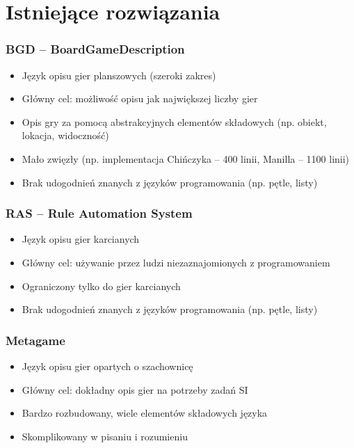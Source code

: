 \documentclass{beamer}
\begin{document}
\section{Istniejące rozwiązania}

\begin{frame}
	\frametitle{BGD -- BoardGameDescription\cite{BGD}}
	\begin{itemize}
		\item Język opisu gier planszowych (szeroki zakres)
		\item Główny cel: możliwość opisu jak największej liczby gier
		\item Opis gry za pomocą abstrakcyjnych elementów składowych (np. obiekt, lokacja, widoczność)
		\item Mało zwięzły (np. implementacja Chińczyka -- 400 linii, Manilla -- 1100 linii)
		\item Brak udogodnień znanych z języków programowania (np. pętle, listy)
	\end{itemize}
\end{frame}

\begin{frame}
	\frametitle{RAS -- Rule Automation System\cite{RAS}}
	\begin{itemize}
		\item Język opisu gier karcianych
		\item Główny cel: używanie przez ludzi niezaznajomionych z programowaniem
		\item Ograniczony tylko do gier karcianych
		\item Brak udogodnień znanych z języków programowania (np. pętle, listy)
	\end{itemize}
\end{frame}

\begin{frame}
	\frametitle{Metagame\cite{metagame}}
	\begin{itemize}
		\item Język opisu gier opartych o szachownicę
		\item Główny cel: dokładny opis gier na potrzeby zadań SI
		\item Bardzo rozbudowany, wiele elementów składowych języka
		\item Skomplikowany w pisaniu i rozumieniu
	\end{itemize}
\end{frame}
\end{document}
